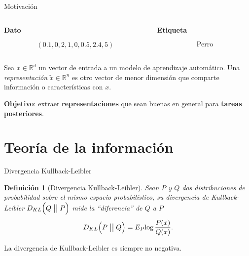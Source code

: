 \documentclass[aspectratio=169]{beamer}
\newcommand\KL[2]{D_{KL}\Big(#1 \bigm|\bigm| #2\Big)}
\newcommand{\R}{\mathbb{R}}
\newtheorem{defi}{Definición}
\begin{document}
  \begin{frame}{Motivación}

  \centering
  \begin{columns}
      \begin{column}{0.5\textwidth}
        \begin{center}
        \textbf{Dato}
        \end{center}
        \[
      \left(0.1,0,2,1,0,0.5,2.4,5 \right)  
     \]
      \end{column}
      \begin{column}{0.5\textwidth}  %
        \begin{center}
          \textbf{Etiqueta}
          \end{center}
        \[
        \text{Perro}  
        \]

      \end{column}
    \end{columns}


    \pause 
    
    \begin{shaded}
      Sea $x \in \R^d$ un vector de entrada a un modelo de aprendizaje automático. Una \emph{representación} $\tilde{x} \in \R^n$ es otro vector de menor dimensión que comparte información o características con $x$.
    \end{shaded}


    {\color{Maroon}\textbf{Objetivo}:} extraer \textbf{representaciones} que sean buenas en general para \textbf{tareas posteriores}.
  \end{frame}

  
  \section{Teoría de la información}


\begin{frame}{Divergencia Kullback-Leibler}
  \begin{defi}[Divergencia Kullback-Leibler]
Sean \(P\) y \(Q\) dos distribuciones de probabilidad sobre el mismo espacio probabilístico, su \emph{divergencia de Kullback-Leibler} \(\KL{Q}{P}\) mide la ``diferencia'' de \(Q\) a \(P\)
\[
  \KL{P}{Q} = E_P{\log \frac{P(x)}{Q(x)}}.
\]
  \end{defi}
  La divergencia de Kullback-Leibler es siempre no negativa.

\end{frame}
  
\end{document}
